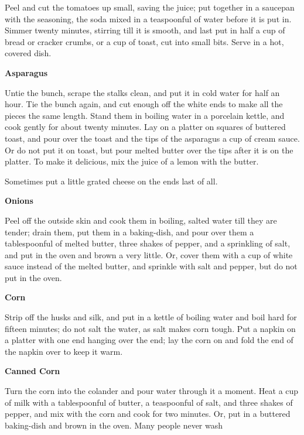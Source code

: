 \documentclass[11pt]{book}
\newcommand{\indpar}{\par\noindent\hspace*{\parindent}}
\newcommand{\instruction}{\indpar}
\newenvironment{RecipeTitle}{\medskip\begin{center}\large\bf }{\end{center}\smallskip}
\begin{document}
\instruction  Peel and cut the tomatoes up small, saving the juice;
put together in a saucepan with the seasoning, the soda
mixed in a teaspoonful of water before it is put in.  Simmer
twenty minutes, stirring till it is smooth, and last put in
half a cup of bread or cracker crumbs, or a cup of toast,
cut into small bits.  Serve in a hot, covered dish.
\begin{RecipeTitle}
Asparagus\label{asparagus}
\end{RecipeTitle}
\instruction  Untie the bunch, scrape the stalks clean, and put it in
cold water for half an hour.  Tie the bunch again, and cut
enough off the white ends to make all the pieces the same
length.  Stand them in boiling water in a porcelain kettle,
and cook gently for about twenty minutes.  Lay on a platter
on squares of buttered toast, and pour over the toast and
the tips of the asparagus a cup of cream sauce.  Or do not
put it on toast, but pour melted butter over the tips after
it is on the platter.  To make it delicious, mix the juice
of a lemon with the butter.
\instruction  Sometimes put a little grated cheese on the ends last
of all.
\begin{RecipeTitle}
Onions\label{onions}
\end{RecipeTitle}
\instruction  Peel off the outside skin and cook them in boiling, salted
water till they are tender; drain them, put them in a
baking-dish, and pour over them a tablespoonful of melted
butter, three shakes of pepper, and a sprinkling of salt,
and put in the oven and brown a very little.  Or, cover
them with a cup of white sauce instead of the melted butter,
and sprinkle with salt and pepper, but do not put in the oven.
\begin{RecipeTitle}
Corn\label{corn}
\end{RecipeTitle}
\instruction  Strip off the husks and silk, and put in a kettle of
boiling water and boil hard for fifteen minutes; do not
salt the water, as salt makes corn tough.  Put a napkin
on a platter with one end hanging over the end; lay the corn
on and fold the end of the napkin over to keep it warm.
\begin{RecipeTitle}
Canned Corn\label{canned_corn}
\end{RecipeTitle}
\instruction  Turn the corn into the colander and pour water through it a
moment.  Heat a cup of milk with a tablespoonful of butter, a
teaspoonful of salt, and three shakes of pepper, and mix with
the corn and cook for two minutes.  Or, put in a buttered
baking-dish and brown in the oven.  Many people never wash
\end{document}
